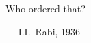 \begin{flushright}
\begin{hangleftquote}{\QENOpen}{\QENClose}
Who ordered that?
\end{hangleftquote}
\par\smallskip
\normalfont — I.I.~Rabi, 1936
\end{flushright}
